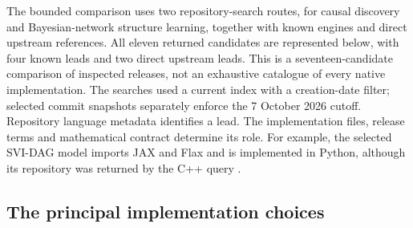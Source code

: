 The bounded comparison uses two repository-search routes, for causal discovery
and Bayesian-network structure learning, together with known engines and
direct upstream references. All eleven returned candidates are represented
below, with four known leads and two direct upstream leads. This is a
seventeen-candidate comparison of inspected releases, not an exhaustive
catalogue of every native implementation. The searches used a current index
with a creation-date filter; selected commit snapshots separately enforce the
7 October 2026 cutoff. Repository language metadata identifies a lead. The
implementation files, release terms and mathematical contract determine its
role. For example, the selected SVI-DAG model imports JAX and Flax and is
implemented in Python, although its repository was returned by the C++ query
\citep{exec13_cxx_svidag}.

\subsection{The principal implementation choices}


